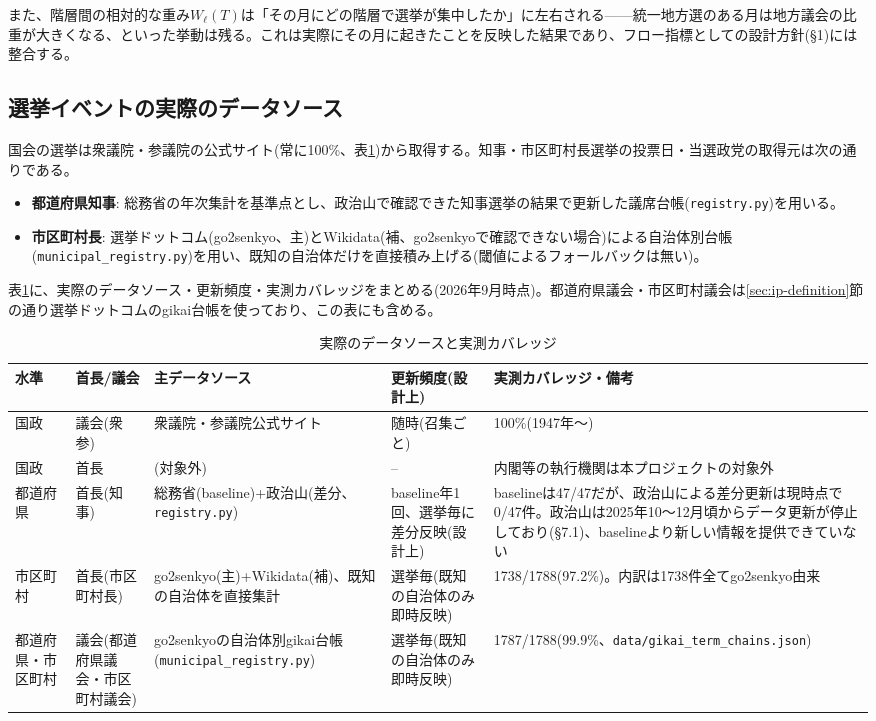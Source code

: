 \documentclass[a4paper,11pt]{ltjsarticle}
\begin{document}
また、階層間の相対的な重み$W_\ell(T)$は「その月にどの階層で選挙が集中したか」に左右される——統一地方選のある月は地方議会の比重が大きくなる、といった挙動は残る。これは実際にその月に起きたことを反映した結果であり、フロー指標としての設計方針(\S1)には整合する。

\subsection{選挙イベントの実際のデータソース}
\label{sec:data-source-switching}

国会の選挙は衆議院・参議院の公式サイト(常に100\%、表\ref{tab:coverage})から取得する。知事・市区町村長選挙の投票日・当選政党の取得元は次の通りである。

\begin{itemize}
  \item \textbf{都道府県知事}: 総務省の年次集計を基準点とし、政治山で確認できた知事選挙の結果で更新した議席台帳(\texttt{registry.py})を用いる。
  \item \textbf{市区町村長}: 選挙ドットコム(go2senkyo、主)とWikidata(補、go2senkyoで確認できない場合)による自治体別台帳(\texttt{municipal\_registry.py})を用い、既知の自治体だけを直接積み上げる(閾値によるフォールバックは無い)。
\end{itemize}

表\ref{tab:coverage}に、実際のデータソース・更新頻度・実測カバレッジをまとめる(2026年9月時点)。都道府県議会・市区町村議会は\ref{sec:ip-definition}節の通り選挙ドットコムのgikai台帳を使っており、この表にも含める。

\begin{table}[ht]
\centering
\small
\caption{実際のデータソースと実測カバレッジ}
\label{tab:coverage}
\begin{tabular}{p{1.5cm}p{1.9cm}p{3.6cm}p{2.2cm}p{4.3cm}}
\toprule
水準 & 首長/議会 & 主データソース & 更新頻度(設計上) & 実測カバレッジ・備考 \\
\midrule
国政 & 議会(衆参) & 衆議院・参議院公式サイト & 随時(召集ごと) & 100\%(1947年〜) \\
国政 & 首長 & (対象外) & -- & 内閣等の執行機関は本プロジェクトの対象外 \\
都道府県 & 首長(知事) & 総務省(baseline)+政治山(差分、\texttt{registry.py}) & baseline年1回、選挙毎に差分反映(設計上) & baselineは47/47だが、政治山による差分更新は現時点で0/47件。政治山は2025年10〜12月頃からデータ更新が停止しており(\S7.1)、baselineより新しい情報を提供できていない \\
市区町村 & 首長(市区町村長) & go2senkyo(主)+Wikidata(補)、既知の自治体を直接集計 & 選挙毎(既知の自治体のみ即時反映) & 1738/1788(97.2\%)。内訳は1738件全てgo2senkyo由来 \\
都道府県・市区町村 & 議会(都道府県議会・市区町村議会) & go2senkyoの自治体別gikai台帳(\texttt{municipal\_registry.py}) & 選挙毎(既知の自治体のみ即時反映) & 1787/1788(99.9\%、\texttt{data/gikai\_term\_chains.json}) \\
\bottomrule
\end{tabular}
\end{table}
\end{document}
